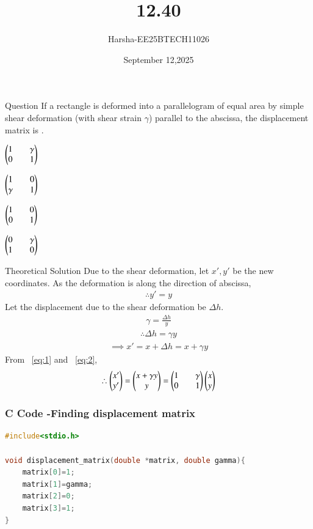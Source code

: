 \documentclass{beamer}
\title %
{12.40}
\date{September 12,2025}
\author %
{Harsha-EE25BTECH11026}
\begin{document}
\frame{\titlepage}


\begin{frame}{Question}
If a rectangle is deformed into a parallelogram of equal area by simple shear deformation (with shear strain $\gamma$) parallel to the abscissa, the displacement matrix is \underline{\hspace{2cm}}.
\begin{enumerate}
\begin{multicols}{2}
    \item $\begin{pmatrix}1&&\gamma\\0&&1\end{pmatrix}$
    \item $\begin{pmatrix}1&&0\\\gamma&&1\end{pmatrix}$
    \item $\begin{pmatrix}1&&0\\0&&1\end{pmatrix}$
    \item $\begin{pmatrix}0&&\gamma\\1&&0\end{pmatrix}$
\end{multicols}
\end{enumerate}
\end{frame}

\begin{frame}{Theoretical Solution}
Due to the shear deformation, let $x',y'$ be the new coordinates. As the deformation is along the direction of abscissa,
\begin{align}
    \therefore y'=y \label{eq:1}
\end{align}
Let the displacement due to the shear deformation be $\Delta h$.
\begin{align}
    \gamma=\frac{\Delta h}{y}
\end{align}
\begin{align}
    \therefore \Delta h=\gamma y
\end{align}
\begin{align}
    \implies x'=x+\Delta h=x+\gamma y \label{eq:2}
\end{align}
From ~\eqref{eq:1} and ~\eqref{eq:2},
\begin{align}
    \therefore \begin{pmatrix}x'\\y'\end{pmatrix}=\begin{pmatrix}x+\gamma y \\ y\end{pmatrix}=\begin{pmatrix}1&&\gamma\\0&&1\end{pmatrix}\begin{pmatrix}x\\y\end{pmatrix}
\end{align}
\end{frame}


\begin{frame}[fragile]
    \frametitle{C Code -Finding displacement matrix}

    \begin{lstlisting}[language=C]
#include<stdio.h>

void displacement_matrix(double *matrix, double gamma){
	matrix[0]=1;
	matrix[1]=gamma;
	matrix[2]=0;
	matrix[3]=1;
}
    \end{lstlisting}
\end{frame}
\end{document}
